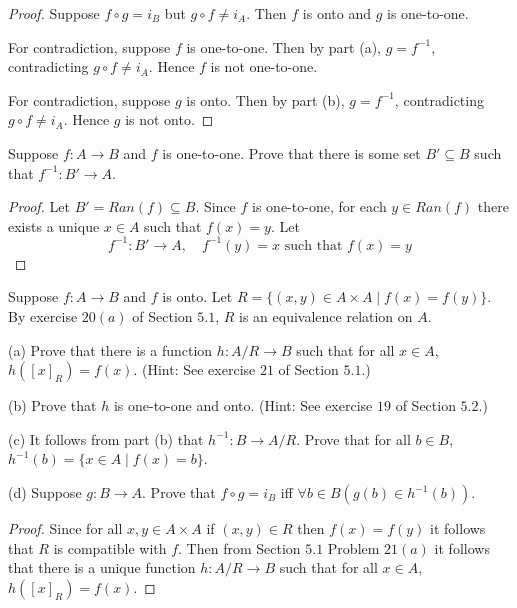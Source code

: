 \begin{proof}
    Suppose $f \circ g = i_B$ but $g \circ f \ne i_A$.  
    Then $f$ is onto and $g$ is one-to-one.  

    For contradiction, suppose $f$ is one-to-one.  
    Then by part (a), $g = f^{-1}$, contradicting $g \circ f \ne i_A$.  
    Hence $f$ is not one-to-one.  

    For contradiction, suppose $g$ is onto.  
    Then by part (b), $g = f^{-1}$, contradicting $g \circ f \ne i_A$.  
    Hence $g$ is not onto.  
\end{proof}

\begin{tcolorbox}[title=Problem 12, breakable]
    Suppose $f : A \rightarrow B$ and $f$ is one-to-one.
    Prove that there is some set $B' \subseteq B$ 
        such that $f^{-1} : B' \rightarrow A$.
\end{tcolorbox}

\begin{proof}
    Let $B' = Ran(f) \subseteq B$.
    Since $f$ is one-to-one, for each $y \in Ran(f)$ there exists a unique $x \in A$
        such that $f(x) = y$.
    Let 
    \[
        f^{-1} : B' \rightarrow A, \quad f^{-1}(y) = x \text{ such that } f(x) = y
    \]
\end{proof}

\begin{tcolorbox}[title=Problem 13, breakable]
    Suppose $f : A \rightarrow B$ and $f$ is onto.
    Let $R = \{(x, y) \in A \times A \mid f(x) = f(y)\}$.
    By exercise $20(a)$ of Section $5.1$, $R$ is an equivalence
        relation on $A$.

    (a) Prove that there is a function $h : A / R \rightarrow B$ such that 
        for all $x \in A$, $h([x]_R) = f(x)$.
        (Hint: See exercise $21$ of Section $5.1.$)

    (b) Prove that $h$ is one-to-one and onto. (Hint: See exercise $19$ of 
        Section $5.2.$)

    (c) It follows from part (b) that $h^{-1} : B \rightarrow A / R$.
        Prove that for all $b \in B$, $h^{-1}(b) = \{x \in A \mid f(x) = b\}$.

    (d) Suppose $g : B \rightarrow A$. Prove that $f \circ g = i_B$
        iff $\forall{b} \in B(g(b) \in h^{-1}(b))$.
\end{tcolorbox}

\begin{proof}
    Since for all $x, y \in A \times A$
        if $(x, y) \in R$ then $f(x) = f(y)$
        it follows that $R$ is compatible with $f$.
    Then from Section $5.1$ Problem $21(a)$
        it follows that there is a unique function $h : A / R \rightarrow B$ such that 
        for all $x \in A$, $h([x]_R) = f(x)$.
\end{proof}

